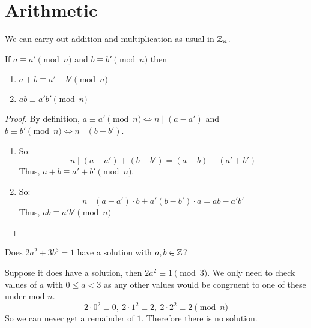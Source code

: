 \documentclass[../main.tex]{subfiles}
\begin{document}
\section{Arithmetic}
We can carry out addition and multiplication as usual in $\mathbb{Z}_n$.
\begin{proposition}
  If $a \equiv a' \pmod{n}$ and $b \equiv b' \pmod{n}$ then
  \begin{enumerate}
    \item $a + b \equiv a' + b' \pmod{n}$
    \item $ab \equiv a'b' \pmod{n}$
  \end{enumerate}
\end{proposition}
\begin{proof}
  By definition, $a \equiv a' \pmod{n} \iff n \mid (a - a')$ and $b \equiv b' \pmod{n} \iff n \mid (b - b')$.
  \begin{enumerate}
    \item So:
      \[
        n \mid (a - a') + (b - b') = (a + b) - (a' + b')
      \]
      Thus, $a + b \equiv a' + b' \pmod{n}$.
    \item So:
      \[
        n \mid (a - a')\cdot b + a' (b - b') \cdot a = ab - a'b'
      \]
      Thus, $ab \equiv a'b' \pmod{n}$
  \end{enumerate}
\end{proof}
\begin{example}
  Does $2a^2 + 3b^3 = 1$ have a solution with $a, b \in \mathbb{Z}$?

  Suppose it does have a solution, then $2a^2 \equiv 1 \pmod{3}$.
  We only need to check values of $a$ with $0 \leq a < 3$ as any other values would be congruent to one of these under mod $n$.
  \[
    2 \cdot 0^{2} \equiv 0,\ 2 \cdot 1^{2} \equiv 2,\ 2 \cdot 2^{2} \equiv 2 \pmod{n}
  \]
  So we can never get a remainder of $1$.
  Therefore there is no solution.
\end{example}
\end{document}
